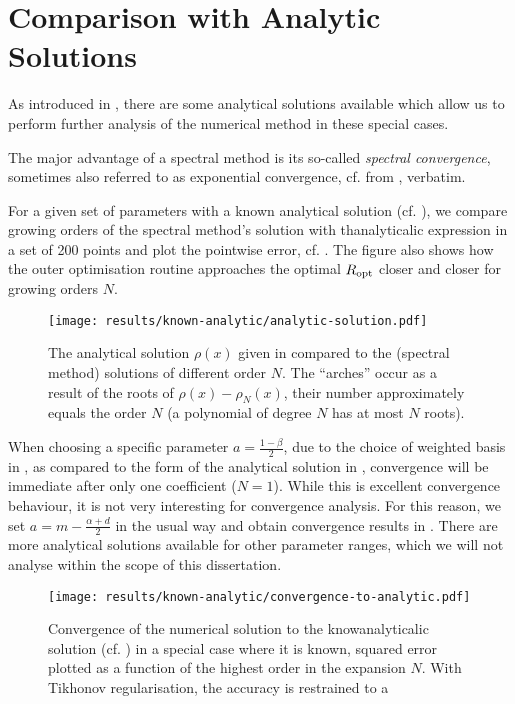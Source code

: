 \section{Comparison with Analytic Solutions}
As introduced in , there are some analytical solutions available which allow us to perform further analysis of the numerical method in these special cases.

The major advantage of a spectral method is its so-called \textit{spectral convergence}, sometimes also referred to as exponential convergence, cf.  from \cite{2023-damtp-spectral-methods}, verbatim.


For a given set of parameters with a known analytical solution (cf. ), we compare growing orders of the spectral method's solution with thanalyticalic expression in a set of 200 points and plot the pointwise error, cf. .
The figure also shows how the outer optimisation routine approaches the optimal $R_{\rm opt}$ closer and closer for growing orders $N$.

\begin{figure}[H]
  \centering
  \texttt{[image: results/known-analytic/analytic-solution.pdf]}
  \caption[Comparison with analytical solutions and error]{
    The analytical solution $\rho(x)$ given in  compared to the (spectral method) solutions of different order $N$.
    The ``arches'' occur as a result of the roots of $\rho(x) - \rho_N(x)$, their number approximately equals the order $N$ (a polynomial of degree $N$ has at most $N$ roots).
  }
  \label{fig:analytic-solution}
\end{figure}

When choosing a specific parameter $a = \frac{1-\beta}{2}$, due to the choice of weighted basis in , as compared to the form of the analytical solution in , convergence will be immediate after only one coefficient ($N=1$).
While this is excellent convergence behaviour, it is not very interesting for convergence analysis.
For this reason, we set $a = m - \frac{\alpha+d}{2}$ in the usual way and obtain convergence results in .
There are more analytical solutions available for other parameter ranges, which we will not analyse within the scope of this dissertation.

\begin{figure}[H]
  \centering
  \texttt{[image: results/known-analytic/convergence-to-analytic.pdf]}
  \caption[Convergence to analytical solution]{Convergence of the numerical solution to the knowanalyticalic solution (cf. ) in a special case where it is known, squared error plotted as a function of the highest order in the expansion $N$. With Tikhonov regularisation, the accuracy is restrained to a }
  \label{fig:convergence-to-analytic}
\end{figure}
